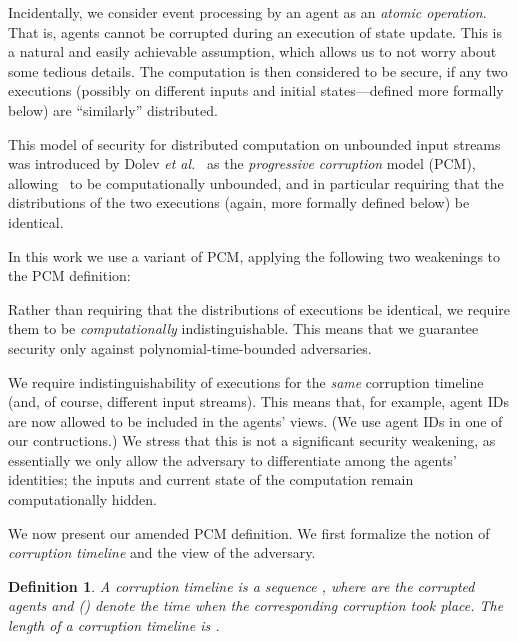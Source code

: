 \documentclass[letterpaper,11pt]{article}
\newcommand{\Ad}{}
\newtheorem{definition}{Definition}
\newlength{\saveparindent}
\newlength{\saveparskip}
\newcounter{ctr}
\newenvironment{newenum}{\begin{list}{{\rm \arabic{ctr}.}\hfill}{\usecounter{ctr}\labelwidth=17pt\labelsep=6pt \leftmargin=23pt \topsep=.5pt\setlength{\listparindent}{\saveparindent}\setlength{\parsep}{\saveparskip}\setlength{\itemsep}{5pt} }}{\end{list}}
\begin{document}
Incidentally, we consider event processing by an agent as an
{\em atomic operation}.  That is, agents cannot be corrupted during an
execution of
state update.  This
is a natural and easily achievable assumption, which allows us to not
worry about some tedious details.  The computation is then considered
to be secure, if any two executions (possibly on different inputs and
initial states---defined more formally
below) 
are ``similarly''
distributed.  

This model of security for distributed computation on unbounded input
streams was introduced by Dolev {\em et al.}~\cite{DGGK11} as the {\it
progressive corruption} model (PCM), allowing \Ad\ to be
computationally unbounded, and in particular requiring that the
distributions of the two executions (again, more formally defined
below) be identical.

In this work we use a variant of PCM, applying the following two
weakenings to the PCM definition:
\begin{newenum}
\item Rather than requiring that the distributions of executions be identical,
we require them to be {\em computationally} indistinguishable.
This means that we guarantee security only against polynomial-time-bounded
adversaries.


\item We 
require indistinguishability of executions for the {\em same} corruption
timeline (and, of course, different input streams).  This means that,
for example, agent IDs are now allowed to be included in the agents'
views. (We use agent IDs in one of our contructions.)
We stress that this is not a significant security weakening,
as essentially we only allow the adversary to differentiate among the
agents' identities;
the inputs and current state of the computation remain computationally
hidden.
\end{newenum}


We now present our amended PCM definition.  We first formalize the
notion of 
{\em corruption timeline} and  the view of the adversary.



\begin{definition}
A {\em corruption timeline}  is a sequence , where  are the
corrupted agents and  ()
 denote the time when the corresponding corruption took place.
The {\em length} of
a corruption timeline is .
\end{definition} 
\end{document}
